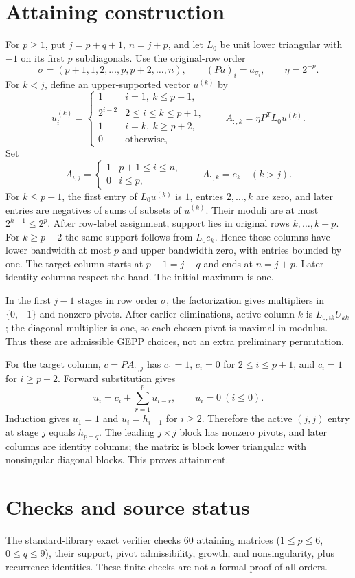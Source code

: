 \documentclass[11pt]{article}
\begin{document}
\section{Attaining construction}
For $p\ge1$, put $j=p+q+1$, $n=j+p$, and let $L_0$ be unit lower triangular with $-1$ on its first $p$ subdiagonals. Use the original-row order
\[
\sigma=(p+1,1,2,\ldots,p,p+2,\ldots,n),\qquad (Pa)_i=a_{\sigma_i},\qquad \eta=2^{-p}.
\]
For $k<j$, define an upper-supported vector $u^{(k)}$ by
\[
u_i^{(k)}=\begin{cases}
1&i=1,\ k\le p+1,\\
2^{i-2}&2\le i\le k\le p+1,\\
1&i=k,\ k\ge p+2,\\
0&\text{otherwise},
\end{cases}
\qquad A_{:,k}=\eta P^TL_0u^{(k)}.
\]
Set
\[
A_{i,j}=\begin{cases}1&p+1\le i\le n,\\0&i\le p,\end{cases}
\qquad A_{:,k}=e_k\quad(k>j).
\]
For $k\le p+1$, the first entry of $L_0u^{(k)}$ is $1$, entries $2,\ldots,k$ are zero, and later entries are negatives of sums of subsets of $u^{(k)}$. Their moduli are at most $2^{k-1}\le2^p$. After row-label assignment, support lies in original rows $k,\ldots,k+p$. For $k\ge p+2$ the same support follows from $L_0e_k$. Hence these columns have lower bandwidth at most $p$ and upper bandwidth zero, with entries bounded by one. The target column starts at $p+1=j-q$ and ends at $n=j+p$. Later identity columns respect the band. The initial maximum is one.

In the first $j-1$ stages in row order $\sigma$, the factorization gives multipliers in $\{0,-1\}$ and nonzero pivots. After earlier eliminations, active column $k$ is $L_{0,ik}U_{kk}$; the diagonal multiplier is one, so each chosen pivot is maximal in modulus. Thus these are admissible GEPP choices, not an extra preliminary permutation.

For the target column, $c=PA_{:,j}$ has $c_1=1$, $c_i=0$ for $2\le i\le p+1$, and $c_i=1$ for $i\ge p+2$. Forward substitution gives
\[
u_i=c_i+\sum_{r=1}^p u_{i-r},\qquad u_i=0\ (i\le0).
\]
Induction gives $u_1=1$ and $u_i=h_{i-1}$ for $i\ge2$. Therefore the active $(j,j)$ entry at stage $j$ equals $h_{p+q}$. The leading $j\times j$ block has nonzero pivots, and later columns are identity columns; the matrix is block lower triangular with nonsingular diagonal blocks. This proves attainment.
\section{Checks and source status}
The standard-library exact verifier checks 60 attaining matrices ($1\le p\le6$, $0\le q\le9$), their support, pivot admissibility, growth, and nonsingularity, plus recurrence identities. These finite checks are not a formal proof of all orders.
\end{document}
